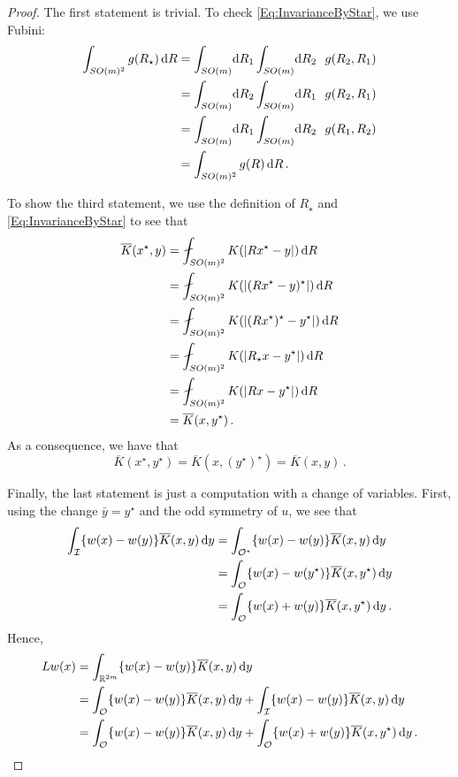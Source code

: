 \begin{proof}
The first statement is trivial. To check \eqref{Eq:InvarianceByStar}, we use Fubini:
\begin{align*}
\int_{SO(m)^2} g(R_\star) \d R & = \int_{SO(m)} \!\! \d R_1 \int_{SO(m)} \!\! \d R_2 \ \ g(R_2, R_1) \\
& =  \int_{SO(m)} \!\! \d R_2 \int_{SO(m)} \!\! \d R_1 \ \ g(R_2, R_1) \\
& =  \int_{SO(m)} \!\! \d R_1 \int_{SO(m)} \!\! \d R_2 \ \ g(R_1, R_2) \\
& =  \int_{SO(m)^2} g(R) \d R\,.
\end{align*}

To show the third statement, we use the definition of $R_\star$ and \eqref{Eq:InvarianceByStar}
to see that
\begin{align*}
\overline{K}(x^\star,y) &= \average_{SO(m)^2} K(|Rx^\star - y|) \d R \\
&= \average_{SO(m)^2} K(|(Rx^\star - y)^\star|) \d R \\
&= \average_{SO(m)^2} K(|(R x^\star)^\star - y^\star|) \d R \\
&= \average_{SO(m)^2} K(|R_\star x - y^\star|) \d R \\
&= \average_{SO(m)^2} K(|Rx - y^\star|) \d R \\
&= \overline{K}(x,y^\star)\,.
\end{align*}
As a consequence, we have that
$$\overline{K}(x^\star,y^\star) = \overline{K}(x,(y^\star)^\star) = \overline{K}(x,y)\,.$$



Finally, the last statement is just a computation with a change of variables. First, using the
change $\bar{y} = y^\star$ and the odd symmetry of $u$, we see that
\begin{align*}
\int_{\mathcal{I}}  \{w(x) - w(y) \} \overline{K}(x, y)\,\mathrm{d} y &= \int_{\mathcal{O}^\star} \{w(x) - w(y) \}\overline{K}(x, y)\,\mathrm{d} y \\
&= \int_{\mathcal{O}} \{w(x) - w(y^\star) \}\overline{K}(x, y^\star)\,\mathrm{d} y \\
&= \int_{\mathcal{O}} \{w(x) + w(y) \}\overline{K}(x, y^\star)\,\mathrm{d} y\,.
\end{align*}
Hence,
\begin{align*}
Lw (x) &= \int_{\mathbb{R}^{2m}}  \{w(x) - w(y) \} \overline{K}(x, y)\,\mathrm{d} y \\
&= \int_{\mathcal{O}}  \{w(x) - w(y) \} \overline{K}(x, y)\,\mathrm{d} y +\int_{\mathcal{I}}  \{w(x) - w(y) \} \overline{K}(x, y)\,\mathrm{d} y \\
&= \int_{\mathcal{O}} \{w(x) - w(y) \} \overline{K}(x, y) \,\mathrm{d} y +  \int_{\mathcal{O}} \{w(x) + w(y) \} \overline{K}(x, y^\star) \,\mathrm{d} y \,.
\end{align*}
\end{proof}

